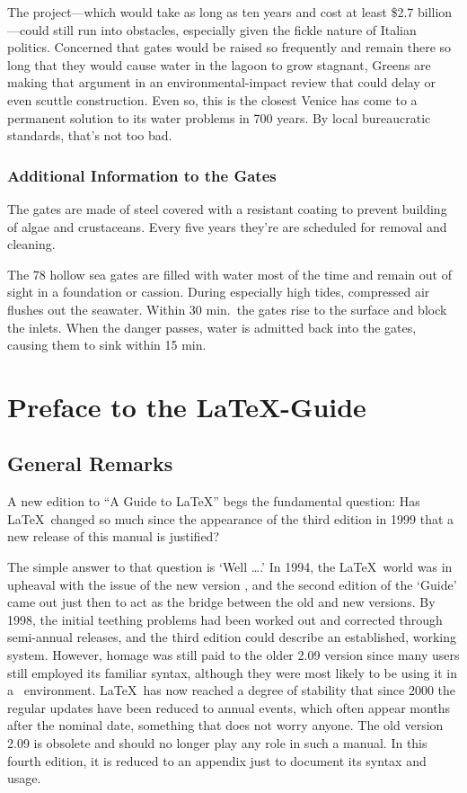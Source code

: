 \documentclass[twoside]{report}
\begin{document}
The project---which would take as long as ten years and cost at least
\$2.7 billion---could still run into obstacles, especially given the
fickle nature of Italian politics. Concerned that gates would be raised
so frequently and remain there so long that they would cause water in the
lagoon to grow stagnant, Greens are making that argument in an
environmental-impact review that could delay or even scuttle construction.
Even so, this is the closest Venice has come to a permanent solution to 
its water problems in 700 years. By local bureaucratic standards, that's
not too bad.


\subsection{Additional Information to the Gates}

The gates are made of steel covered with a resistant coating to prevent
building of algae and crustaceans. Every five years they're are scheduled 
for removal and cleaning.

The 78 hollow sea gates are filled with water most of the time and remain
out of sight in a foundation or cassion. During especially high tides,
compressed air flushes out the seawater. Within 30 min.\ the gates rise
to the surface and block the inlets. When the danger passes, water is
admitted back into the gates, causing them to sink within 15 min. 

\chapter{Preface to the \LaTeX-Guide}
\section{General Remarks}

A new edition to ``A Guide to \LaTeX'' begs the fundamental question:
Has \LaTeX\ changed so much since the appearance of the third edition in 1999
that a new release of this manual is justified?

The simple answer to that question is `Well \dots.' In 1994, the \LaTeX\
world was in upheaval with the issue of the new version \LaTeXe, and the
second edition of the `Guide' came out just then to act as the bridge
between the old and new versions. By 1998, the initial teething problems had
been worked out and corrected through semi-annual releases, and the third
edition could describe an established, working system. However, homage was
still paid to the older 2.09 version since many users still employed its
familiar syntax, although they were most likely to be using it in a \LaTeXe\
environment. \LaTeX\ has now reached a degree of stability that since 2000
the regular updates have been reduced to annual events, which often appear
months after the nominal date, something that does not worry anyone. The old
version 2.09 is obsolete and should no longer play any role in such a manual.
In this fourth edition, it is reduced to an appendix just to document its
syntax and usage.
\end{document}
